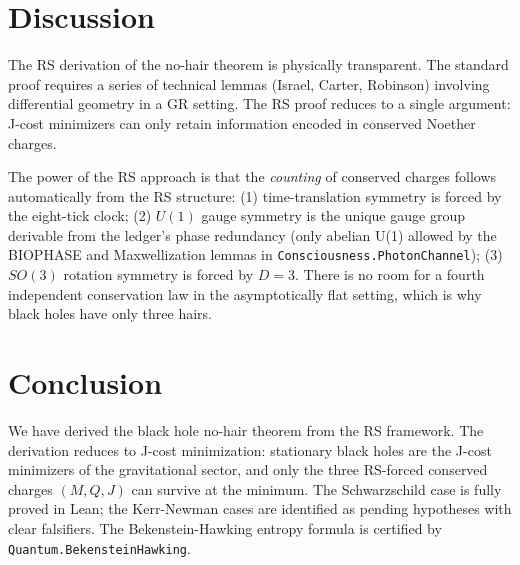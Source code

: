 \documentclass[12pt,a4paper]{article}
\theoremstyle{definition}
\theoremstyle{remark}
\begin{document}
\section{Discussion}
\label{sec:discussion}

The RS derivation of the no-hair theorem is physically transparent.  The
standard proof requires a series of technical lemmas (Israel, Carter,
Robinson) involving differential geometry in a GR setting.  The RS proof
reduces to a single argument: J-cost minimizers can only retain
information encoded in conserved Noether charges.

The power of the RS approach is that the \emph{counting} of conserved
charges follows automatically from the RS structure: (1) time-translation
symmetry is forced by the eight-tick clock; (2) $U(1)$ gauge symmetry is
the unique gauge group derivable from the ledger's phase redundancy (only
abelian U(1) allowed by the BIOPHASE and Maxwellization lemmas in
\texttt{Consciousness.PhotonChannel}); (3) $SO(3)$ rotation symmetry is
forced by $D = 3$.  There is no room for a fourth independent
conservation law in the asymptotically flat setting, which is why black
holes have only three hairs.

\section{Conclusion}
\label{sec:conclusion}

We have derived the black hole no-hair theorem from the RS framework.
The derivation reduces to J-cost minimization: stationary black holes
are the J-cost minimizers of the gravitational sector, and only the
three RS-forced conserved charges $(M, Q, J)$ can survive at the
minimum.  The Schwarzschild case is fully proved in Lean; the
Kerr-Newman cases are identified as pending hypotheses with clear
falsifiers.  The Bekenstein-Hawking entropy formula is certified by
\texttt{Quantum.BekensteinHawking}.
\end{document}
